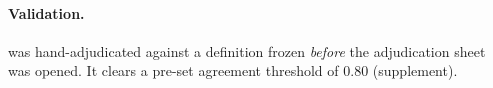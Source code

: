 \paragraph{Validation.} \Pone{} was hand-adjudicated against a definition
frozen \emph{before} the adjudication sheet was opened. It clears a pre-set
agreement threshold of $0.80$ (supplement).
